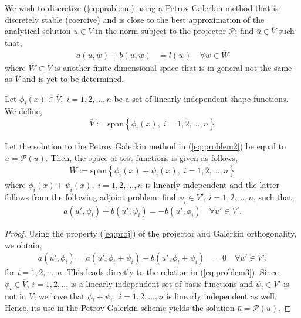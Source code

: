 We wish to discretize (\ref{eq:problem}) using a Petrov-Galerkin method that is discretely stable (coercive) and is close to the best approximation of the analytical solution $u \in V$ in the norm subject to the projector $\mathcal{P}$: find $\bar{u} \in \overline{V}$ such that,
\begin{align}
	a(\bar{u},\bar{w}) + b(\bar{u},\bar{w}) &= l(\bar{w}) \quad \forall \bar{w} \in \overline{W}
	\label{eq:problem2}
\end{align}
where $\overline{W} \subset V$ is another finite dimensional space that is in general not the same as $\overline{V}$ and is yet to be determined. 

\begin{definition} Let $ \phi_i(x) \in \overline{V}, \; i=1,2,...,n$ be a set of linearly independent shape functions. We define,
\begin{align}
	 \overline{V} := \mathrm{span} \left\{ \phi_i(x), \; i=1,2,...,n   \right\} 
\end{align}
\end{definition}

\begin{theorem} Let  the solution to the Petrov Galerkin method in (\ref{eq:problem2}) be equal to $\bar{u} = \mathcal{P}(u)$. Then, the space of test functions is given as follows,
\begin{align}
	& \overline{W} := \mathrm{span} \left\{ \phi_i(x) +  \psi_i(x), \; i=1,2,...,n   \right\} &
\end{align}
where $\phi_i(x) +  \psi_i(x), \; i=1,2,...,n$ is linearly independent and the latter follows from the following adjoint problem: find $\psi_i \in V'$, $i=1,2,...,n$, such that,
\begin{align}
 a(u', \psi_i) + b(u', \psi_i) = - b(u', \phi_i)  \quad \forall u' \in V'.
 \label{eq:problem3}
\end{align}
\end{theorem}
\begin{proof} Using the property (\ref{eq:proj}) of the projector  and Galerkin orthogonality, we obtain,
\begin{align}
	a(u', \phi_i)  = a(u', \phi_i + \psi_i) + b(u', \phi_i + \psi_i) &= 0 \quad \forall u' \in V'.
\end{align}
for $i=1,2,...,n$. This leads directly to the relation in (\ref{eq:problem3}). Since $\phi_i \in \overline{V}$, $i=1,2,...$ is a linearly independent set of basis functions and $\psi_i \in V'$ is not in $V$, we have that $\phi_i + \psi_i, \; i=1,2,...,n$ is linearly independent as well. Hence, its use in the Petrov Galerkin scheme yields the solution $\bar{u} = \mathcal{P}(u)$.
\end{proof}

